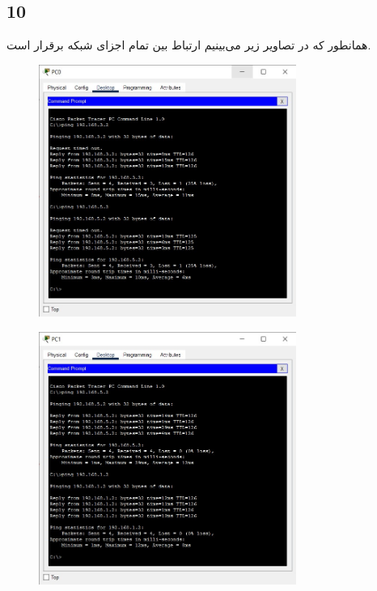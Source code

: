 \documentclass{article}
\begin{document}
\subsection{10}
همانطور که در تصاویر زیر می‌بینیم ارتباط بین تمام اجزای شبکه برقرار است.
\begin{figure}[H]
    \centering
    \includegraphics[width=0.75\textwidth]{figures/2.jpg}
    \caption{}
    \label{fig:fig1}
\end{figure}
\begin{figure}[H]
    \centering
    \includegraphics[width=0.75\textwidth]{figures/3.jpg}
    \caption{}
    \label{fig:fig1}
\end{figure}
\end{document}
